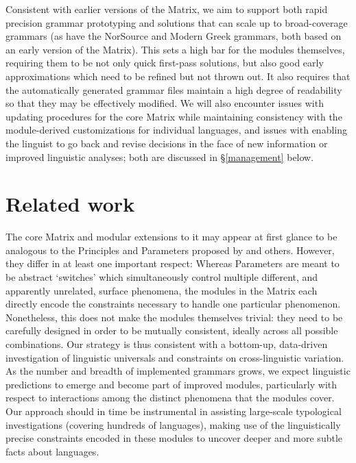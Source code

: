 Consistent with earlier versions of the Matrix, we aim to support both
rapid precision grammar prototyping and solutions that can scale up to
broad-coverage grammars (as have the NorSource \cite{Hel:Hau:03} and
Modern Greek \cite{Kor:Neu:2003} grammars, both based on an early
version of the Matrix). This sets a high bar for the modules
themselves, requiring them to be not only quick first-pass solutions,
but also good early approximations which need to be refined but not
thrown out.  It also requires that the automatically generated grammar
files maintain a high degree of readability so that they may be
effectively modified.  We will also encounter issues with updating
procedures for the core Matrix while maintaining consistency with the
module-derived customizations for individual languages, and issues
with enabling the linguist to go back and revise decisions in the face
of new information or improved linguistic analyses; both are discussed
in \S\ref{management} below.

\section{Related work}

The core Matrix and modular extensions to it may appear at first
glance to be analogous to the Principles and Parameters proposed by
 and others.  However, they differ in at least one
important respect: Whereas Parameters are meant to be abstract
`switches' which simultaneously control multiple different, and
apparently unrelated, surface phenomena, the modules in the Matrix
each directly encode the constraints necessary to handle one
particular phenomenon.  Nonetheless, this does not make the modules
themselves trivial: they need to be carefully designed in order to be
mutually consistent, ideally across all possible combinations.  Our
strategy is thus consistent with a bottom-up, data-driven
investigation of linguistic universals and constraints on
cross-linguistic variation.  As the number and breadth of implemented
grammars grows, we expect linguistic predictions to emerge and become
part of improved modules, particularly with respect to interactions
among the distinct phenomena that the modules cover.  Our approach
should in time be instrumental in assisting large-scale typological
investigations (covering hundreds of languages), making use of the
linguistically precise constraints encoded in these modules to uncover
deeper and more subtle facts about languages.

